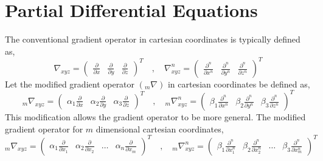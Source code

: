 \chapter{Partial Differential Equations}
\begin{comment}
Currently, only discussions of the Sturm -Liouville, the other applications are placed elsewhere, such as Physics Archives or Fluid Archives
modified gradient operators need to be revised very closely!!!!!!
\end{comment}
The conventional gradient operator in cartesian coordinates is typically defined as,
$$\nabla_{xyz} = \begin{pmatrix}\displaystyle{\frac{\partial}{\partial x}} & \displaystyle{\frac{\partial}{\partial y}} & \displaystyle{\frac{\partial}{\partial z}}\end{pmatrix}^T\quad,\quad \nabla^n_{xyz} = \begin{pmatrix}\displaystyle{\frac{\partial^n}{\partial x^n}} & \displaystyle{\frac{\partial^n}{\partial y^n}} & \displaystyle{\frac{\partial^n}{\partial z^n}}\end{pmatrix}^T$$
Let the modified gradient operator $\displaystyle{({}_{m}\nabla)}$ in cartesian coordinates be defined as,
$${}_{m}\nabla_{xyz} = \begin{pmatrix}\displaystyle{\alpha_1\frac{\partial}{\partial x}} & \displaystyle{\alpha_2\frac{\partial}{\partial y}} & \displaystyle{\alpha_3\frac{\partial}{\partial z}}\end{pmatrix}^T\quad,\quad {}_{m}\nabla^n_{xyz} = \begin{pmatrix}\displaystyle{\beta_1\frac{\partial^n}{\partial x^n}} & \displaystyle{\beta_2\frac{\partial^n}{\partial y^n}} & \displaystyle{\beta_3\frac{\partial^n}{\partial z^n}}\end{pmatrix}^T$$
This modification allows the gradient operator to be more general. The modified gradient operator for $m$ dimensional cartesian coordinates,
$${}_{m}\nabla_{xyz} = \begin{pmatrix}\displaystyle{\alpha_1\frac{\partial}{\partial x_1}} & \displaystyle{\alpha_2\frac{\partial}{\partial x_2}} & \dots & \displaystyle{\alpha_n\frac{\partial}{\partial x_m}}\end{pmatrix}^T\quad,\quad {}_{m}\nabla^n_{xyz} = \begin{pmatrix}\displaystyle{\beta_1\frac{\partial^n}{\partial x_1^n}} & \displaystyle{\beta_2\frac{\partial^n}{\partial x_2^n}} & \dots & \displaystyle{\beta_3\frac{\partial^n}{\partial x_m^n}}\end{pmatrix}^T$$
